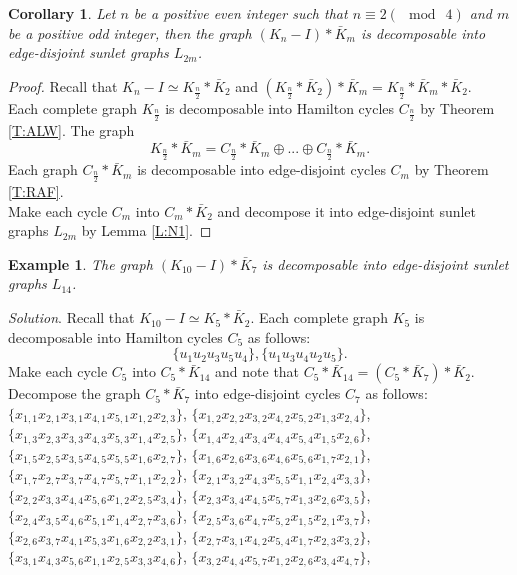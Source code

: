 \documentclass[12pt]{report}
\newtheorem{exm}[thm]{Example}
\newtheorem{cor}[thm]{Corollary}
\begin{document}
\begin{cor}
Let $n$ be a positive even integer such that $n\equiv 2(\mod\ 4)$ and
$m$ be a positive odd integer, then the graph $(K_n-I)*\bar{K}_m$ is
decomposable into edge-disjoint sunlet graphs $L_{2m}$.
\end{cor}
\begin{proof}
Recall that $K_n-I\simeq K_{\frac{n}{2}}*\bar{K}_2$ and
$(K_{\frac{n}{2}}*\bar{K}_2)*\bar{K}_m=K_{\frac{n}{2}}*\bar{K}_m*\bar{K}_2$.\\
Each complete graph $K_{\frac{n}{2}}$ is decomposable into Hamilton
cycles $C_{\frac{n}{2}}$ by Theorem \ref{T:ALW}. The graph
$$K_{\frac{n}{2}}*\bar{K}_m=C_{\frac{n}{2}}*\bar{K}_m\oplus...\oplus
C_{\frac{n}{2}}*\bar{K}_m.$$ Each graph $C_{\frac{n}{2}}*\bar{K}_m$
is decomposable into
edge-disjoint cycles $C_m$ by Theorem \ref{T:RAF}.\\
Make each cycle $C_m$ into $C_m*\bar{K}_2$ and decompose it into
edge-disjoint sunlet graphs $L_{2m}$ by Lemma \ref{L:N1}.
\end{proof}
\begin{exm}
The graph $(K_{10}-I)*\bar{K}_7$ is decomposable into edge-disjoint
sunlet graphs $L_{14}$.
\end{exm}
{\em Solution}.
 Recall that $K_{10}-I\simeq K_5*\bar{K}_2$. Each
complete graph $K_5$ is decomposable into Hamilton cycles $C_5$ as
follows:
$$\{u_1u_2u_3u_5u_4\},\{u_1u_3u_4u_2u_5\}.$$
Make each cycle $C_5$ into $C_5*\bar{K}_{14}$ and note that
$C_5*\bar{K}_{14}=(C_5*\bar{K}_7)*\bar{K}_2$. Decompose the graph
$C_5*\bar{K}_7$ into
edge-disjoint cycles $C_7$ as follows:\\
$\{x_{1,1}x_{2,1}x_{3,1}x_{4,1}x_{5,1}x_{1,2}x_{2,3}\}$,
$\{x_{1,2}x_{2,2}x_{3,2}x_{4,2}x_{5,2}x_{1,3}x_{2,4}\}$,
$\{x_{1,3}x_{2,3}x_{3,3}x_{4,3}x_{5,3}x_{1,4}x_{2,5}\}$,
$\{x_{1,4}x_{2,4}x_{3,4}x_{4,4}x_{5,4}x_{1,5}x_{2,6}\}$,
$\{x_{1,5}x_{2,5}x_{3,5}x_{4,5}x_{5,5}x_{1,6}x_{2,7}\}$,
$\{x_{1,6}x_{2,6}x_{3,6}x_{4,6}x_{5,6}x_{1,7}x_{2,1}\}$,
$\{x_{1,7}x_{2,7}x_{3,7}x_{4,7}x_{5,7}x_{1,1}x_{2,2}\}$,
$\{x_{2,1}x_{3,2}x_{4,3}x_{5,5}x_{1,1}x_{2,4}x_{3,3}\}$,
$\{x_{2,2}x_{3,3}x_{4,4}x_{5,6}x_{1,2}x_{2,5}x_{3,4}\}$,
$\{x_{2,3}x_{3,4}x_{4,5}x_{5,7}x_{1,3}x_{2,6}x_{3,5}\}$,
$\{x_{2,4}x_{3,5}x_{4,6}x_{5,1}x_{1,4}x_{2,7}x_{3,6}\}$,
$\{x_{2,5}x_{3,6}x_{4,7}x_{5,2}x_{1,5}x_{2,1}x_{3,7}\}$,
$\{x_{2,6}x_{3,7}x_{4,1}x_{5,3}x_{1,6}x_{2,2}x_{3,1}\}$,
$\{x_{2,7}x_{3,1}x_{4,2}x_{5,4}x_{1,7}x_{2,3}x_{3,2}\}$,
$\{x_{3,1}x_{4,3}x_{5,6}x_{1,1}x_{2,5}x_{3,3}x_{4,6}\}$,
$\{x_{3,2}x_{4,4}x_{5,7}x_{1,2}x_{2,6}x_{3,4}x_{4,7}\}$,
\end{document}
